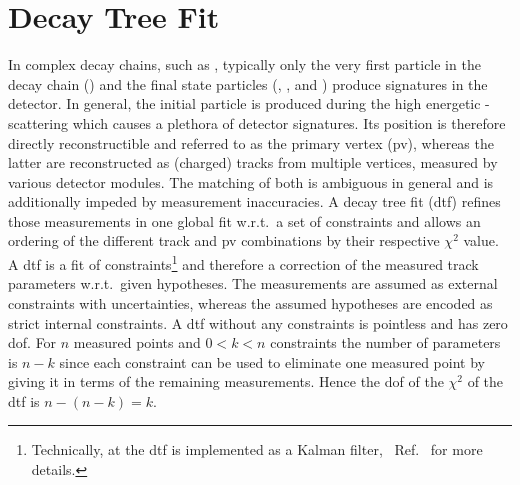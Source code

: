 \chapter{Decay Tree Fit}
\label{chap:apdx_dtf}
In complex decay chains, such as \decay{\Lb}{(\decay{\Dz}{\Km\pip})(\decay{\Lz}{\proton\pim})}, typically only the very first particle in the decay chain (\Lb) and the final state particles (\Km, \pip, \proton and \pim) produce signatures in the detector.
In general, the initial particle is produced during the high energetic \proton\proton-scattering which causes a plethora of detector signatures.
Its position is therefore directly reconstructible and referred to as the primary vertex (\gls{pv}), whereas the latter are reconstructed as (charged) tracks from multiple vertices, measured by various detector modules.
The matching of both is ambiguous in general and is additionally impeded by measurement inaccuracies.
A decay tree fit (\gls{dtf}) refines those measurements in one global fit w.r.t.\ a set of constraints and allows an ordering of the different track and \gls{pv} combinations by their respective $\chi^2$ value.
A \gls{dtf} is a fit of constraints\footnote{Technically, at \lhcb the \gls{dtf} is implemented as a Kalman filter, \cf{}~Ref.~\cite{kalmandtf} for more details.} and therefore a correction of the measured track parameters w.r.t.\ given hypotheses.
The measurements are assumed as external constraints with uncertainties, whereas the assumed hypotheses are encoded as strict internal constraints.
A \gls{dtf} without any constraints is pointless and has zero \gls{dof}.
For $n$ measured points and $0<k<n$ constraints the number of parameters is $n-k$ since each constraint can be used to eliminate one measured point by giving it in terms of the remaining measurements.
Hence the \gls{dof} of the $\chi^2$ of the \gls{dtf} is $n-(n-k)=k$.


